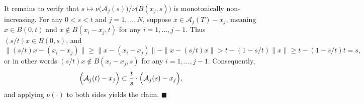 \documentclass[twoside,11pt]{article}
\newcommand{\1}{\mathbf{1}}
\newcommand{\mc}[1]{\mathcal{#1}}
\newcommand{\qed}{\hfill $\blacksquare$}
\begin{document}
It remains to verify that $s \mapsto \nu\bigl(\mc{A}_j(s)\bigr)/\nu\bigl(B(x_j,s)\bigr)$ is monotonically non-increasing. For any $0 < s < t$ and $j = 1,\ldots,N$, suppose $x \in \mc{A}_j(T) - x_j$, meaning $x \in B(0,t)$ and $x \not\in B(x_i - x_j,t)$ for any $i = 1,\ldots,j - 1$. Thus $(s/t)x \in B(0,s)$, and
\begin{equation*}
\|(s/t)x - (x_i - x_j)\| \geq \|x - (x_i - x_j)\| - \|x - (s/t)x\| > t - (1 - s/t)\|x\| \geq t - (1 - s/t)t = s,
\end{equation*}
or in other words $(s/t)x \not\in B(x_i - x_j,s)$ for any $i = 1,\ldots,j - 1$. Consequently,
\begin{equation*}
\Bigl(\mc{A}_j(t) - x_j\Bigr) \subset \frac{t}{s} \cdot \Bigl(\mc{A}_{j}(s)- x_j\Bigr),
\end{equation*}
and applying $\nu(\cdot)$ to both sides yields the claim. \qed \\
\end{document}
